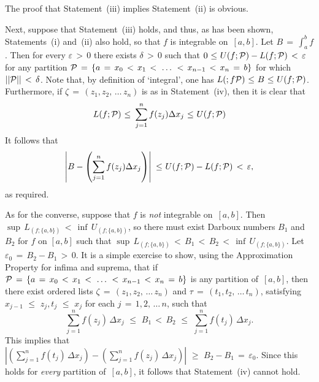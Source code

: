         The proof that Statement~(iii) implies Statement~(ii) is obvious.

\VA

        Next, suppose that Statement~(iii) holds, and thus, as has been shown, Statements~(i) and~(ii) also hold, so that $f$ is integrable on~$[a,b]$. Let ${\displaystyle B \,=\, \int_{a}^{b} f}$.
    Then for every ${\varepsilon}\,>\,0$ there exists ${\delta}\,>\,0$ such that $0\,\,{\leq}\,\,U(f;{\cal P}) - L(f;{\cal P})\,<\,{\varepsilon}$ for any partition
    ${\cal P} \,=\, \{a \,=\, x_{0}\,<\,x_{1}\,<\,\,{\ldots}\,\,<\,x_{n-1}\,<\,x_{n} \,=\, b\}$ for which $||{\cal P}||\,<\,{\delta}$.
    Note that, by definition of `integral', one has $L(;f{\cal P})\,\,{\leq}\,\,B\,\,{\leq}\,\,U(f;{\cal P})$.
   Furthermore, if ${\zeta} \,=\, (z_{1}, z_{2},\,{\ldots}\,z_{n})$ is as in Statement~(iv), then it is clear that 
        \begin{displaymath}
        L(f;{\cal P})\,\,{\leq}\,\,\sum_{j=1}^{n} f(z_{j}){\Delta}x_{j}\,\,{\leq}\,\,U(f;{\cal P})
        \end{displaymath}
    It follows that
        \begin{displaymath}
        \left|B - \left(\sum_{j=1}^{n} f(z_{j}){\Delta}x_{j}\right)\right|
    \,\,{\leq}\,
        \,U(f;{\cal P})-L(f;{\cal P})\,<\,{\varepsilon},
        \end{displaymath}
    as required.

        As for the converse, suppose that $f$ is {\em not} integrable on~$[a,b]$. Then ${\sup}\,L_{(f;\{a,b\})}\,<\,{\inf}\,U_{(f;\{a,b\})}$,
    so there must exist Darboux numbers $B_{1}$ and $B_{2}$ for $f$ on $[a,b]$ such that ${\sup}\,L_{(f;\{a,b\})}\,<\,B_{1}\,<\,B_{2}\,<\,{\inf}\,U_{(f;\{a,b\})}$.
    Let ${\varepsilon}_{0} \,=\, B_{2}-B_{1}\,>\,0$. It is a simple exercise to show, using the Approximation Property for infima and suprema,
    that if ${\cal P} \,=\, \{a \,=\, x_{0}\,<\,x_{1}\,<\,\,{\ldots}\,\,<\,x_{n-1}\,<\,x_{n} \,=\, b\}$ is any partition of~$[a,b]$,
    then there exist ordered lists ${\zeta} \,=\, (z_{1}, z_{2},\,{\ldots}\,z_{n})$ and ${\tau} \,=\, (t_{1}, t_{2},\,{\ldots}\,t_{n})$,
    satisfying $x_{j-1}\,\,{\leq}\,\,z_{j}, t_{j}\,\,{\leq}\,\,x_{j}$ for each $j \,=\, 1,2,\,{\ldots}\,n$, such that
        \begin{displaymath}
        \sum_{j=1}^{n} f(z_{j})\,{\Delta}x_{j}\,\,{\leq}\,\,B_{1}\,<\,B_{2}\,\,{\leq}\,\,\sum_{j=1}^{n} f(t_{j})\,{\Delta}x_{j}.
        \end{displaymath}
    This implies that ${\displaystyle \left|\left(\sum_{j=1}^{n} f(t_{j})\,{\Delta}x_{j}\right) - \left(\sum_{j=1}^{n} f(z_{j})\,{\Delta}x_{j}\right)\right|\,\,{\geq}\,\,B_{2}-B_{1} \,=\, {\varepsilon}_{0}}$.
    Since this holds for {\em every} partition of~$[a,b]$, it follows that Statement~(iv) cannot hold. %

